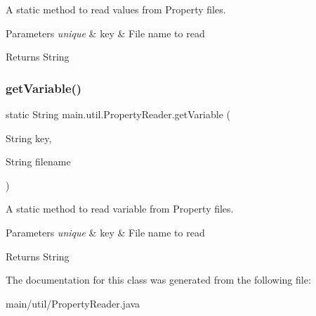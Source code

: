 A static method to read values from Property files. 
\begin{DoxyParams}{Parameters}
{\em unique} & key \& File name to read \\
\hline
\end{DoxyParams}
\begin{DoxyReturn}{Returns}
String 
\end{DoxyReturn}
\mbox{\label{classmain_1_1util_1_1_property_reader_afe8518f6cdcdef0822dcf94d236eae6c}} 
\subsubsection{\texorpdfstring{get\+Variable()}{getVariable()}}
{\footnotesize\ttfamily static String main.\+util.\+Property\+Reader.\+get\+Variable (\begin{DoxyParamCaption}\item[{String}]{key,  }\item[{String}]{filename }\end{DoxyParamCaption})\hspace{0.3cm}{\ttfamily [static]}}

A static method to read variable from Property files. 
\begin{DoxyParams}{Parameters}
{\em unique} & key \& File name to read \\
\hline
\end{DoxyParams}
\begin{DoxyReturn}{Returns}
String 
\end{DoxyReturn}


The documentation for this class was generated from the following file\+:\begin{DoxyCompactItemize}
\item 
main/util/Property\+Reader.\+java\end{DoxyCompactItemize}
